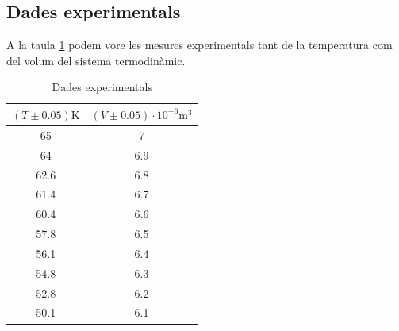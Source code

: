\documentclass{article}
\begin{document}
    \subsection{Dades experimentals}\label{appendix:dades}
        A la taula \ref{tab:dades} podem vore les mesures experimentals tant de la temperatura com del volum del sistema termodinàmic.
        \begin{table}[h]\centering\label{tab:dades}\caption{Dades experimentals}
            \begin{tabular}{|cc|}
                \hline
                \rowcolor[HTML]{9698ED} 
                \textbf{$\left( T \pm 0.05\right) \si{\kelvin}$} & \textbf{$\left( V \pm 0.05\right) \cdot 10^{-6} \si{\meter}^3$} \\ \hline
                \rowcolor[HTML]{FFFFFF} 
                65                                               & 7                                                               \\
                \rowcolor[HTML]{DAE8FC} 
                64                                               & 6.9                                                             \\
                \rowcolor[HTML]{FFFFFF} 
                62.6                                             & 6.8                                                             \\
                \rowcolor[HTML]{DAE8FC} 
                61.4                                             & 6.7                                                             \\
                \rowcolor[HTML]{FFFFFF} 
                60.4                                             & 6.6                                                             \\
                \rowcolor[HTML]{DAE8FC} 
                57.8                                             & 6.5                                                             \\
                \rowcolor[HTML]{FFFFFF} 
                56.1                                             & 6.4                                                             \\
                \rowcolor[HTML]{DAE8FC} 
                54.8                                             & 6.3                                                             \\
                \rowcolor[HTML]{FFFFFF} 
                52.8                                             & 6.2                                                             \\
                \rowcolor[HTML]{DAE8FC} 
                50.1                                             & 6.1                                                             \\ \hline
            \end{tabular}
        \end{table} 
\end{document}

